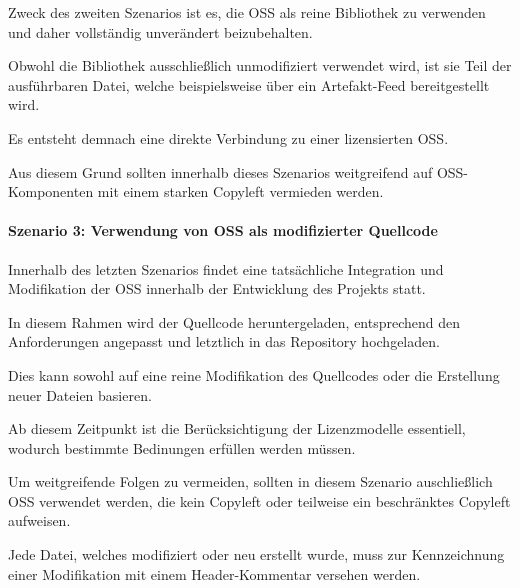 Zweck des zweiten Szenarios ist es, die OSS als reine Bibliothek zu verwenden und daher vollständig unverändert beizubehalten. 

Obwohl die Bibliothek ausschließlich unmodifiziert verwendet wird, ist sie Teil der ausführbaren Datei, welche beispielsweise über ein Artefakt-Feed bereitgestellt wird. 

Es entsteht demnach eine direkte Verbindung zu einer lizensierten OSS. 

Aus diesem Grund sollten innerhalb dieses Szenarios weitgreifend auf OSS-Komponenten mit einem starken Copyleft vermieden werden. 

\paragraph{Szenario 3: Verwendung von OSS als modifizierter Quellcode}

Innerhalb des letzten Szenarios findet eine tatsächliche Integration und Modifikation der OSS innerhalb der Entwicklung des Projekts statt.

In diesem Rahmen wird der Quellcode heruntergeladen, entsprechend den Anforderungen angepasst und letztlich in das Repository hochgeladen. 

Dies kann sowohl auf eine reine Modifikation des Quellcodes oder die Erstellung neuer Dateien basieren.  

Ab diesem Zeitpunkt ist die Berücksichtigung der Lizenzmodelle essentiell, wodurch bestimmte Bedinungen erfüllen werden müssen. 

Um weitgreifende Folgen zu vermeiden, sollten in diesem Szenario auschließlich OSS verwendet werden, die kein Copyleft oder teilweise ein beschränktes Copyleft aufweisen.

Jede Datei, welches modifiziert oder neu erstellt wurde, muss zur Kennzeichnung einer Modifikation mit einem Header-Kommentar versehen werden.

